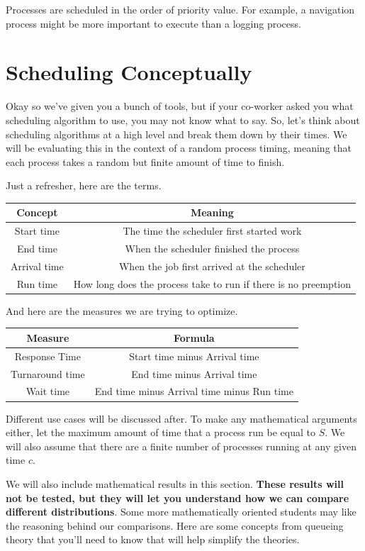 Processes are scheduled in the order of priority value.
For example, a navigation process might be more important to execute than a logging process.

\section{Scheduling Conceptually}

Okay so we've given you a bunch of tools, but if your co-worker asked you what scheduling algorithm to use, you may not know what to say.
So, let's think about scheduling algorithms at a high level and break them down by their times.
We will be evaluating this in the context of a random process timing, meaning that each process takes a random but finite amount of time to finish.

Just a refresher, here are the terms.

\begin{tabular}{|c|c|}
  Concept & Meaning \\ \hline
  Start time & The time the scheduler first started work \\
  End time & When the scheduler finished the process \\
  Arrival time & When the job first arrived at the scheduler \\
  Run time & How long does the process take to run if there is no preemption
\end{tabular}

And here are the measures we are trying to optimize.

\begin{tabular}{|c|c|}
  Measure & Formula \\ \hline
  Response Time & Start time minus Arrival time\\
  Turnaround time & End time minus Arrival time\\
  Wait time & End time minus Arrival time minus Run time \\
\end{tabular}

Different use cases will be discussed after.
To make any mathematical arguments either, let the maximum amount of time that a process run be equal to $S$.
We will also assume that there are a finite number of processes running at any given time $c$.

We will also include mathematical results in this section.
\textbf{These results will not be tested, but they will let you understand how we can compare different distributions}.
Some more mathematically oriented students may like the reasoning behind our comparisons.
Here are some concepts from queueing theory that you'll need to know that will help simplify the theories.

